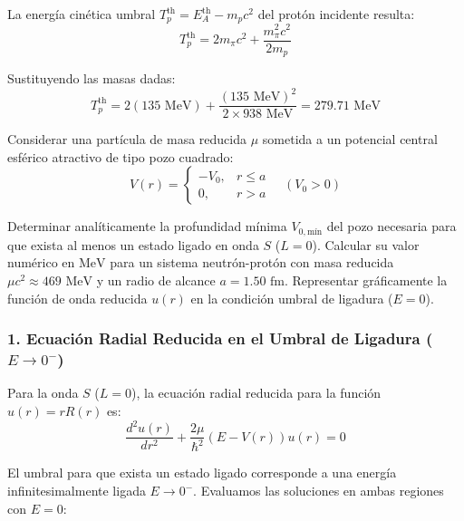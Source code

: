 \begin{problema}
La energía cinética umbral $T_p^{\text{th}} = E_A^{\text{th}} - m_p c^2$ del protón incidente resulta:
\begin{equation*}
T_p^{\text{th}} = 2 m_\pi c^2 + \frac{m_\pi^2 c^2}{2 m_p}
\end{equation*}

Sustituyendo las masas dadas:
\begin{equation*}
T_p^{\text{th}} = 2 (135 \text{ MeV}) + \frac{(135 \text{ MeV})^2}{2 \times 938 \text{ MeV}} = 279.71 \text{ MeV}
\end{equation*}

\end{problema}
\newpage
\begin{problema}
Considerar una partícula de masa reducida $\mu$ sometida a un potencial central esférico atractivo de tipo pozo cuadrado:
\begin{equation*}
V(r) = \begin{cases} -V_0, & r \le a \\ 0, & r > a \end{cases} \quad (V_0 > 0)
\end{equation*}

Determinar analíticamente la profundidad mínima $V_{0,\text{mín}}$ del pozo necesaria para que exista al menos un estado ligado en onda $S$ ($L=0$). Calcular su valor numérico en $\text{MeV}$ para un sistema neutrón-protón con masa reducida $\mu c^2 \approx 469 \text{ MeV}$ y un radio de alcance $a = 1.50 \text{ fm}$. Representar gráficamente la función de onda reducida $u(r)$ en la condición umbral de ligadura ($E = 0$).

\tcblower

\subsubsection*{1. Ecuación Radial Reducida en el Umbral de Ligadura ($E \to 0^-$)}

Para la onda $S$ ($L=0$), la ecuación radial reducida para la función $u(r) = r R(r)$ es:
\begin{equation*}
\frac{d^2 u(r)}{dr^2} + \frac{2\mu}{\hbar^2} \left( E - V(r) \right) u(r) = 0
\end{equation*}

El umbral para que exista un estado ligado corresponde a una energía infinitesimalmente ligada $E \to 0^-$. Evaluamos las soluciones en ambas regiones con $E = 0$:


\end{problema}
